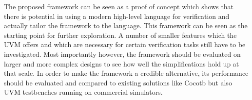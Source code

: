 



The proposed framework can be seen as a proof of concept which shows that there is potential in using a modern high-level language for verification and actually tailor the framework to the language. This framework can be seen as the starting point for further exploration. A number of smaller features which the UVM offers and which are necessary for certain verification tasks still have to be investigated. Most importantly however, the framework should be evaluated on larger and more complex designs to see how well the simplifications hold up at that scale. In order to make the framework a credible alternative, its performance should be evaluated and compared to existing solutions like Cocotb but also UVM testbenches running on commercial simulators.


